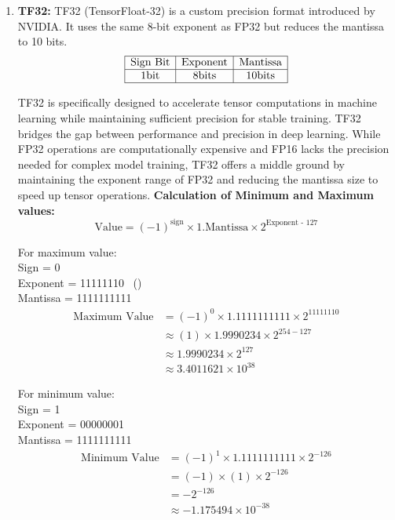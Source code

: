 \begin{enumerate}[label=\textbf{\roman*.}]
    \item \textbf{TF32:}
    TF32 (TensorFloat-32) is a custom precision format introduced by NVIDIA. It uses the same 8-bit exponent as FP32 but reduces the mantissa to 10 bits.
    \[
    \begin{array}{|c|c|c|}
        \hline
        \text{Sign Bit} & \text{Exponent} & \text{Mantissa} \\
        \hline
        1 \text{bit} & 8 \text{bits} & 10 \text{bits} \\
        \hline
    \end{array}
    \]

    TF32 is specifically designed to accelerate tensor computations in machine learning while maintaining sufficient precision for stable training. TF32 bridges the gap between performance and precision in deep learning. While FP32 operations are computationally expensive and FP16 lacks the precision needed for complex model training, TF32 offers a middle ground by maintaining the exponent range of FP32 and reducing the mantissa size to speed up tensor operations.
    \textbf{Calculation of Minimum and Maximum values:} 
    \[
        \text{Value} = (-1)^{\text{sign}} \times 1.\text{Mantissa} \times 2^{\text{Exponent - 127}}
    \]

    For maximum value:\\
    Sign = 0 \\
    Exponent = 11111110 \ () \\
    Mantissa = 1111111111
    \[
        \begin{aligned}
            \text{Maximum Value} &= (-1)^{0} \times 1.1111111111 \times 2^{11111110} \\
            & \approx (1) \times 1.9990234 \times 2^{254 - 127} \\
            & \approx 1.9990234 \times 2^{127} \\
            & \approx 3.4011621 \times 10^{38}
        \end{aligned}
    \]

    For minimum value:\\

    Sign = 1 \\
    Exponent = 00000001 \\
    Mantissa = 1111111111
    \[
        \begin{aligned}
            \text{Minimum Value} &= (-1)^{1} \times 1.1111111111 \times 2^{-126} \\
            & = (-1) \times (1) \times 2^{-126} \\
            & =  -2^{-126} \\
            & \approx -1.175494 \times 10^{-38}
        \end{aligned}
    \]


\end{enumerate}
